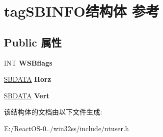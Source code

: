 \hypertarget{structtag_s_b_i_n_f_o}{}\section{tag\+S\+B\+I\+N\+F\+O结构体 参考}
\label{structtag_s_b_i_n_f_o}
\subsection*{Public 属性}
\begin{DoxyCompactItemize}
\item 
\mbox{\label{structtag_s_b_i_n_f_o_a58c2cc5235cd22e83d64e9cb66c93c8a}} 
I\+NT {\bfseries W\+S\+Bflags}
\item 
\mbox{\label{structtag_s_b_i_n_f_o_a5f639ca1d25d23dc3a1897d9b2359769}} 
\hyperlink{structtag_s_b_d_a_t_a}{S\+B\+D\+A\+TA} {\bfseries Horz}
\item 
\mbox{\label{structtag_s_b_i_n_f_o_a092a80f91723c59000d458ddd56dfbc9}} 
\hyperlink{structtag_s_b_d_a_t_a}{S\+B\+D\+A\+TA} {\bfseries Vert}
\end{DoxyCompactItemize}


该结构体的文档由以下文件生成\+:\begin{DoxyCompactItemize}
\item 
E\+:/\+React\+O\+S-\/0../win32ss/include/ntuser.\+h\end{DoxyCompactItemize}

